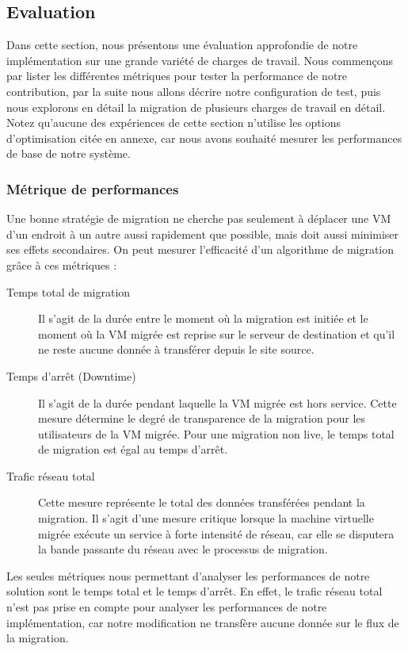 \subsection{Evaluation}
Dans cette section, nous présentons une évaluation approfondie de notre implémentation sur une grande variété de charges de travail.
Nous commençons par lister les différentes métriques pour tester la performance de notre contribution, par la suite nous allons décrire notre configuration de test, puis nous explorons en détail la migration de plusieurs charges de travail en détail.
Notez qu'aucune des expériences de cette section n'utilise les options d'optimisation citée en annexe, car nous avons souhaité mesurer les performances de base de notre système.


\subsubsection{Métrique de performances}
Une bonne stratégie de migration ne cherche pas seulement à déplacer une VM d'un endroit à un autre aussi rapidement que possible, mais doit aussi minimiser ses effets secondaires.
On peut mesurer l'efficacité d'un algorithme de migration grâce à ces métriques :

\begin{description}
\item[Temps total de migration]
Il s'agit de la durée entre le moment où la migration est initiée et le moment où la VM migrée est reprise sur le serveur de destination et qu'il ne reste aucune donnée à transférer depuis le site source.
\item[Temps d'arrêt (Downtime)] Il s'agit de la durée pendant laquelle la VM migrée est hors service.
Cette mesure détermine le degré de transparence de la migration pour les utilisateurs de la VM migrée.
Pour une migration non live, le temps total de migration est égal au temps d'arrêt.
\item[Trafic réseau total]
Cette mesure représente le total des données transférées pendant la migration.
Il s'agit d'une mesure critique lorsque la machine virtuelle migrée exécute un service à forte intensité de réseau, car elle se disputera la bande passante du réseau avec le processus de migration.
\end{description}

Les seules métriques nous permettant d'analyser les performances de notre solution sont le temps total et le temps d'arrêt.
En effet, le trafic réseau total n'est pas prise en compte pour analyser les performances de notre implémentation, car notre modification ne transfère aucune donnée sur le flux de la migration.


